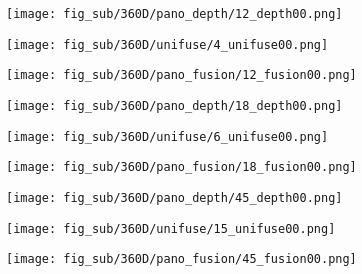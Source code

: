 \FloatBarrier

\begin{figure*}[t]
	\centering
	\captionsetup[subfigure]{labelformat=empty}
	
	
	\begin{subfigure}{0.3\linewidth}
		\texttt{[image: fig\_sub/360D/pano\_depth/12\_depth00.png]}
	\end{subfigure}
	\begin{subfigure}{0.3\linewidth}
		\texttt{[image: fig\_sub/360D/unifuse/4\_unifuse00.png]}
	\end{subfigure}
	\begin{subfigure}{0.3\linewidth}
		\texttt{[image: fig\_sub/360D/pano\_fusion/12\_fusion00.png]}
	\end{subfigure}
	
	\vspace{1pt}
	
	\begin{subfigure}{0.3\linewidth}
		\texttt{[image: fig\_sub/360D/pano\_depth/18\_depth00.png]}
	\end{subfigure}
	\begin{subfigure}{0.3\linewidth}
		\texttt{[image: fig\_sub/360D/unifuse/6\_unifuse00.png]}
	\end{subfigure}
	\begin{subfigure}{0.3\linewidth}
		\texttt{[image: fig\_sub/360D/pano\_fusion/18\_fusion00.png]}
	\end{subfigure}
	
	\vspace{1pt}

	
	\begin{subfigure}{0.3\linewidth}
		\texttt{[image: fig\_sub/360D/pano\_depth/45\_depth00.png]}
	\end{subfigure}
	\begin{subfigure}{0.3\linewidth}
		\texttt{[image: fig\_sub/360D/unifuse/15\_unifuse00.png]}
	\end{subfigure}
	\begin{subfigure}{0.3\linewidth}
		\texttt{[image: fig\_sub/360D/pano\_fusion/45\_fusion00.png]}
	\end{subfigure}
	
	\vspace{1pt}


\end{figure*}
